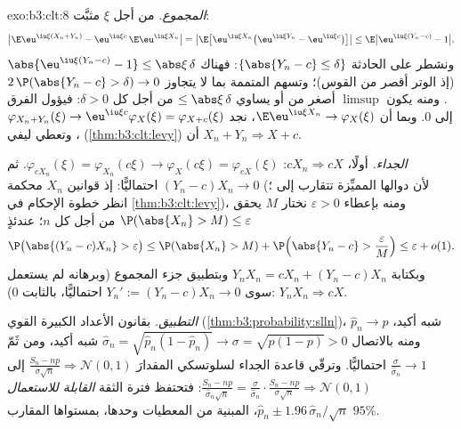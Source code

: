 \begin{solution}{exo:b3:clt:8}
\emph{المجموع.} من أجل $\xi$ مثبَّت:
\[
\bigl|\E\eu^{\iu\xi(X_n+Y_n)} -
\eu^{\iu\xi c}\,\E\eu^{\iu\xi X_n}\bigr|
= \bigl|\E\bigl[\eu^{\iu\xi X_n}\bigl(\eu^{\iu\xi Y_n} -
\eu^{\iu\xi c}\bigr)\bigr]\bigr|
\leq \E\bigl|\eu^{\iu\xi(Y_n - c)} - 1\bigr| .
\]
ونشطر على الحادثة $\{\abs{Y_n - c} \leq \delta\}$: فهناك $\abs{\eu^{\iu\xi(Y_n-c)} - 1} \leq \abs\xi\,\delta$ (إذ الوتر أقصر من
القوس)؛ وتسهم المتممة بما لا يتجاوز $2\,\P(\abs{Y_n - c} > \delta) \to 0$. ومنه يكون
$\limsup$ أصغر من أو يساوي $\leq \abs\xi\,\delta$ من أجل كل $\delta > 0$:
فيؤول الفرق إلى $0$. وبما أن $\E\eu^{\iu\xi X_n} \to
\varphi_X(\xi)$، نجد $\varphi_{X_n+Y_n}(\xi) \to
\eu^{\iu\xi c}\varphi_X(\xi) = \varphi_{X+c}(\xi)$، وتعطي ليفي
(\cref{thm:b3:clt:levy}) أن $X_n + Y_n
\Rightarrow X + c$.

\emph{الجداء.} أولًا، $cX_n \Rightarrow cX$: $\varphi_{cX_n}(\xi) = \varphi_{X_n}(c\xi) \to
\varphi_X(c\xi) = \varphi_{cX}(\xi)$. ثم $(Y_n - c)X_n
\to 0$ احتماليًّا:
إذ قوانين $X_n$ محكمة (لأن دوالها المميِّزة تتقارب إلى ؛ انظر خطوة الإحكام في \cref{thm:b3:clt:levy})، ومنه بإعطاء $\varepsilon > 0$
نختار $M$ يحقق $\P(\abs{X_n} > M) \leq \varepsilon$ من أجل كل $n$؛ عندئذٍ
\[
\P\bigl(\abs{(Y_n - c)X_n} > \varepsilon\bigr) \leq
\P(\abs{X_n} > M) + \P\Bigl(\abs{Y_n - c} >
\frac{\varepsilon}{M}\Bigr) \leq \varepsilon + o(1) .
\]
وبكتابة $Y_nX_n = cX_n + (Y_n - c)X_n$ وبتطبيق جزء المجموع (وبرهانه لم يستعمل سوى
$Y_n' := (Y_n - c)X_n \to 0$ احتماليًّا، بالثابت $0$): $Y_nX_n \Rightarrow cX$.

\emph{التطبيق.} بقانون الأعداد الكبيرة القوي (\cref{thm:b3:probability:slln})،
$\hat p_n \to p$ شبه أكيد، ومنه بالاتصال $\hat\sigma_n = \sqrt{\hat p_n(1 - \hat p_n)}
\to \sigma = \sqrt{p(1 - p)} > 0$ شبه أكيد، ومن
ثَمّ $\frac{\sigma}{\hat\sigma_n} \to 1$ احتماليًّا. وترقّي قاعدة الجداء لسلوتسكي المقدارَ
$\frac{S_n - np}{\sigma\sqrt n}
\Rightarrow \mathcal N(0,1)$ إلى $\frac{S_n -
np}{\hat\sigma_n\sqrt n} = \frac{\sigma}{\hat\sigma_n}\cdot
\frac{S_n - np}{\sigma\sqrt n} \Rightarrow \mathcal N(0,1)$: فتحتفظ فترة الثقة \emph{القابلة للاستعمال}
$\hat p_n \pm
1.96\,\hat\sigma_n/\sqrt n$، المبنية من المعطيات وحدها، بمستواها المقارب $95\%$.
\end{solution}

